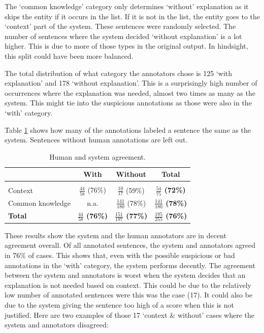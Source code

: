 \documentclass[
10pt, %
a4paper, %
oneside, %
headinclude,footinclude, %
] {book}%
\begin{document}
The `common knowledge' category only determines `without' explanation as it skips the entity if it occurs in the list.
If it is not in the list, the entity goes to the `context' part of the system.
These sentences were randomly selected.
The number of sentences where the system decided `without explanation' is a lot higher. 
This is due to more of those types in the original output.
In hindsight, this split could have been more balanced.

The total distribution of what category the annotators chose is 125 `with explanation' and 178 `without explanation'.
This is a surprisingly high number of occurrences where the explanation was needed, almost two times as many as the system.
This might tie into the suspicious annotations as those were also in the `with' category.

Table \ref{table:agreement} shows how many of the annotations labeled a sentence the same as the system.
Sentences without human annotations are left out.

\begin{table}[hbtp]\centering
  \caption{Human and system agreement.\label{table:agreement}}
  \begin{tabular}{l|ccc}
                     & With                                & Without                               & \textbf{Total}                          \\
    \hline                                                                                                                                   \\
    Context          & \( \frac{44}{58} \) (76\%)          & \( \frac{10}{17} \) (59\%)            & \textbf{\( \frac{54}{75} \) (72\%)}     \\[5pt]
    Common knowledge & n.a.                                & \( \frac{141}{180} \) (78\%)          & \textbf{\( \frac{141}{180} \) (78\%)}   \\[5pt]
    \textbf{Total}   & \textbf{\( \frac{44}{58} \) (76\%)} & \textbf{\( \frac{151}{197} \) (77\%)} & \textbf{ \( \frac{195}{255} \)  (76\%)} \\
  \end{tabular}
\end{table}

These results show the system and the human annotators are in decent agreement overall.
Of all annotated sentences, the system and annotators agreed in 76\% of cases.
This shows that, even with the possible suspicious or bad annotations in the `with' category, the system performs decently.
The agreement between the system and annotators is worst when the system decides that an explanation is not needed based on context.
This could be due to the relatively low number of annotated sentences were this was the case (17).
It could also be due to the system giving the sentence too high of a score when this is not justified.
Here are two examples of those 17 `context \& without' cases where the system and annotators disagreed:
\end{document}
